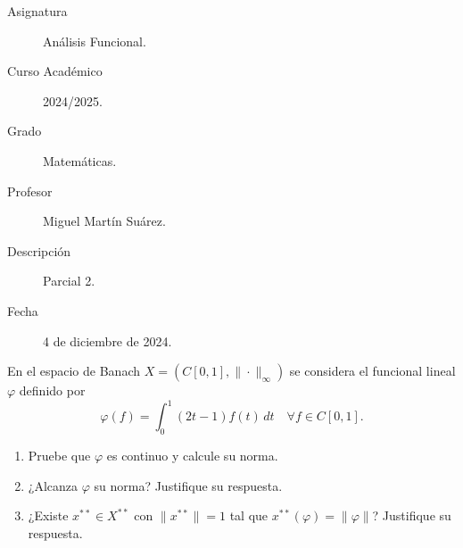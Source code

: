 \documentclass[12pt]{article}
\begin{document}

    
    

    \begin{description}
        \item[Asignatura] Análisis Funcional.
        \item[Curso Académico] 2024/2025.
        \item[Grado] Matemáticas.
        \item[Profesor] Miguel Martín Suárez.
        \item[Descripción] Parcial 2.
        \item[Fecha] 4 de diciembre de 2024.
    
    \end{description}
    \newpage


    
    \begin{ejercicio}
        En el espacio de Banach $X = (C\left[0, 1\right], \|\cdot\|_\infty)$ se considera el funcional lineal $\varphi$ definido por
        \[
            \varphi(f) = \int_0^1 (2t - 1) f(t) \, dt \quad \forall f \in C\left[0, 1\right].
        \]
        \begin{enumerate}[label=\alph*)]
            \item Pruebe que $\varphi$ es continuo y calcule su norma.
            \item ¿Alcanza $\varphi$ su norma? Justifique su respuesta.
            \item ¿Existe $x^{**} \in X^{**}$ con $\|x^{**}\| = 1$ tal que $x^{**}(\varphi) = \|\varphi\|$? Justifique su respuesta.
        \end{enumerate}
    \end{ejercicio}
\end{document}
